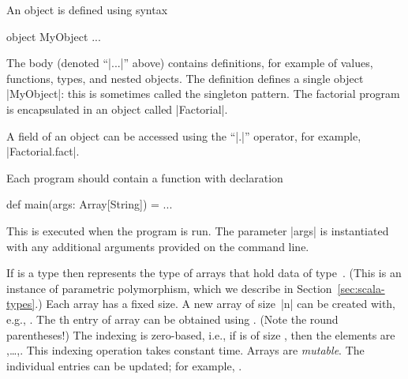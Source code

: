 An object is defined using syntax
\begin{scala}
  object MyObject{ ... }
\end{scala}
%
The body (denoted ``|...|'' above) contains definitions, for example of
values, functions, types, and nested objects.  %
%
The definition defines a single object |MyObject|: this is sometimes called
the singleton pattern.  The factorial program is
encapsulated in an object called |Factorial|.  

A field of an object can be accessed using the ``|.|'' operator,
for example, |Factorial.fact|. 



Each program should contain a function with
declaration
\begin{scala}
  def main(args: Array[String]) = ...
\end{scala}
This is  executed when the program is run.  The parameter |args| is
instantiated with any additional arguments provided on the command line.



If  is a type then  represents the
type of arrays that hold data of type~.  (This is an instance of
parametric polymorphism, which we describe in Section~\ref{sec:scala-types}.)
%
Each array has a fixed size. %
A new array of size~|n| can be created with, e.g.,
.
%
The th entry of array  can be obtained using .
(Note the round parentheses!)  The indexing is zero-based, i.e., if 
is of size , then the elements are ,\ldots,.  This
indexing operation takes constant time.  
%
Arrays are \emph{mutable}.  The individual entries can be updated; for example,
.


